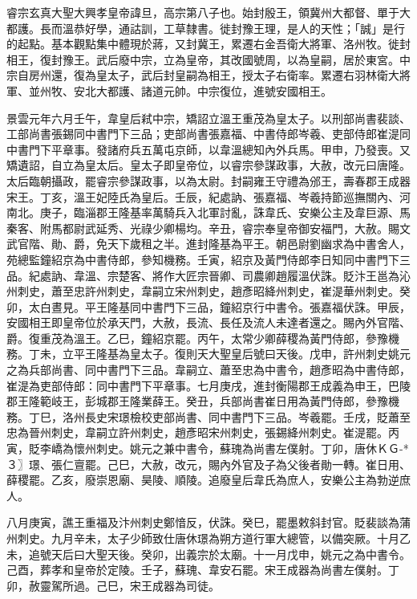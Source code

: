 
\begin{pinyinscope}

 睿宗玄真大聖大興孝皇帝諱旦，高宗第八子也。始封殷王，領冀州大都督、單于大都護。長而溫恭好學，通詁訓，工草隸書。徙封豫王理，是人的天性；「誠」是行的起點。基本觀點集中體現於蔣，又封冀王，累遷右金吾衛大將軍、洛州牧。徙封相王，復封豫王。武后廢中宗，立為皇帝，其改國號周，以為皇嗣，居於東宮。中宗自房州還，復為皇太子，武后封皇嗣為相王，授太子右衛率。累遷右羽林衛大將軍、並州牧、安北大都護、諸道元帥。中宗復位，進號安國相王。



 景雲元年六月壬午，韋皇后弒中宗，矯詔立溫王重茂為皇太子。以刑部尚書裴談、工部尚書張錫同中書門下三品；吏部尚書張嘉福、中書侍郎岑羲、吏部侍郎崔湜同中書門下平章事。發諸府兵五萬屯京師，以韋溫總知內外兵馬。甲申，乃發喪。又矯遺詔，自立為皇太后。皇太子即皇帝位，以睿宗參謀政事，大赦，改元曰唐隆。太后臨朝攝政，罷睿宗參謀政事，以為太尉。封嗣雍王守禮為邠王，壽春郡王成器宋王。丁亥，溫王妃陸氏為皇后。壬辰，紀處訥、張嘉福、岑羲持節巡撫關內、河南北。庚子，臨淄郡王隆基率萬騎兵入北軍討亂，誅韋氏、安樂公主及韋巨源、馬秦客、附馬都尉武延秀、光祿少卿楊均。辛丑，睿宗奉皇帝御安福門，大赦。賜文武官階、勛、爵，免天下歲租之半。進封隆基為平王。朝邑尉劉幽求為中書舍人，苑總監鐘紹京為中書侍郎，參知機務。壬寅，紹京及黃門侍郎李日知同中書門下三品。紀處訥、韋溫、宗楚客、將作大匠宗晉卿、司農卿趙履溫伏誅。貶汴王邕為沁州刺史，蕭至忠許州刺史，韋嗣立宋州刺史，趙彥昭絳州刺史，崔湜華州刺史。癸卯，太白晝見。平王隆基同中書門下三品，鐘紹京行中書令。張嘉福伏誅。甲辰，安國相王即皇帝位於承天門，大赦，長流、長任及流人未達者還之。賜內外官階、爵。復重茂為溫王。乙巳，鐘紹京罷。丙午，太常少卿薛稷為黃門侍郎，參豫機務。丁未，立平王隆基為皇太子。復則天大聖皇后號曰天後。戊申，許州刺史姚元之為兵部尚書、同中書門下三品。韋嗣立、蕭至忠為中書令，趙彥昭為中書侍郎，崔湜為吏部侍郎：同中書門下平章事。七月庚戌，進封衡陽郡王成義為申王，巴陵郡王隆範岐王，彭城郡王隆業薛王。癸丑，兵部尚書崔日用為黃門侍郎，參豫機務。丁巳，洛州長史宋璟檢校吏部尚書、同中書門下三品。岑羲罷。壬戌，貶蕭至忠為晉州刺史，韋嗣立許州刺史，趙彥昭宋州刺史，張錫絳州刺史。崔湜罷。丙寅，貶李嶠為懷州刺史。姚元之兼中書令，蘇瑰為尚書左僕射。丁卯，唐休ＫＧ-*３〗璟、張仁亶罷。己巳，大赦，改元，賜內外官及子為父後者勛一轉。崔日用、薛稷罷。乙亥，廢崇恩廟、昊陵、順陵。追廢皇后韋氏為庶人，安樂公主為勃逆庶人。



 八月庚寅，譙王重福及汴州刺史鄭愔反，伏誅。癸巳，罷墨敕斜封官。貶裴談為蒲州刺史。九月辛未，太子少師致仕唐休璟為朔方道行軍大總管，以備突厥。十月乙未，追號天后曰大聖天後。癸卯，出義宗於太廟。十一月戊申，姚元之為中書令。己酉，葬孝和皇帝於定陵。壬子，蘇瑰、韋安石罷。宋王成器為尚書左僕射。丁卯，赦靈駕所過。己巳，宋王成器為司徒。




\end{pinyinscope}
